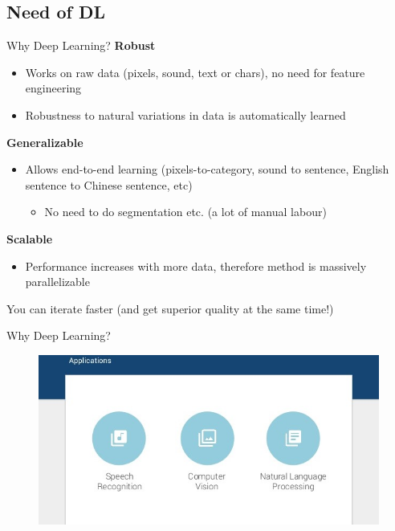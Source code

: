 \documentclass[10pt]{beamer}
\begin{document}
	\subsection{Need of DL}
	\begin{frame}[c]{Why Deep Learning?}
	\pause
	\textbf{Robust}
	\begin{itemize}
		\item Works on raw data (\alert{pixels, sound, text or chars}), no need for feature engineering
		\item Robustness to natural variations in data is automatically learned
	\end{itemize}
	\pause
	\textbf{Generalizable}
	\begin{itemize}	
		\item Allows end-to-end learning (pixels-to-category, sound to sentence, English sentence to Chinese sentence, etc)
		\begin{itemize}
			\item No need to do segmentation etc. (a lot of manual labour)
		\end{itemize}
	\end{itemize}
	\pause
	\textbf{Scalable}
	\begin{itemize}
		\item Performance increases with more data, therefore method is massively parallelizable
	\end{itemize}
	\pause
	\huge You can iterate faster (and get superior quality at the same time!)
	\end{frame}
	\begin{frame}[c]{Why Deep Learning?}
		\begin{figure}
			\includegraphics[width=\linewidth]{images/whydl_app}
		\end{figure}
	\end{frame}
\end{document}
